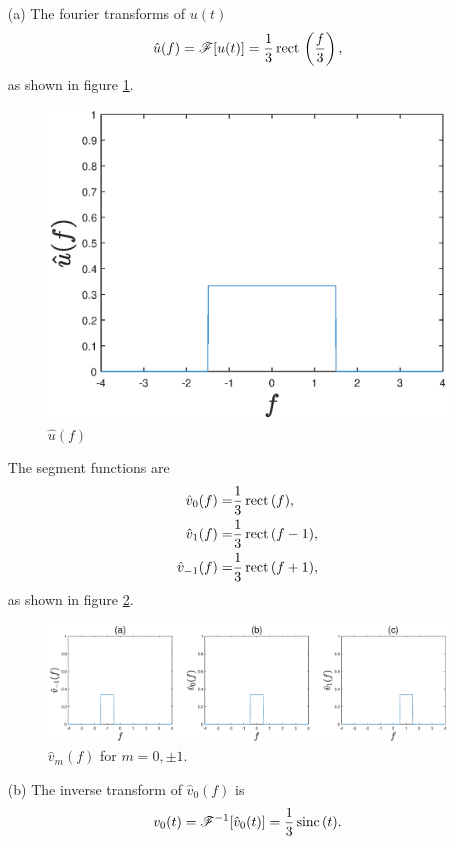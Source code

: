 \documentclass{assignment}
\begin{document}
\begin{sol}
    \begin{itemize}
        \item[(a)] The fourier transforms of $u(t)$
        \begin{align}
            \hat{u}(f)=\mathscr{F}[u(t)]=\frac{1}{3}\,\text{rect}\,\left(\frac{f}{3}\right),
        \end{align}
        as shown in figure \ref{A-8-P-6-u(f)}.
        \begin{figure}[H]
            \centering
            \includegraphics[width=.4\columnwidth]{A-8-P-6-u(f).eps}
            \caption{$\hat{u}(f)$}
            \label{A-8-P-6-u(f)}
        \end{figure}
        The segment functions are
        \begin{align}
            \hat{v}_0(f)=&\frac{1}{3}\,\text{rect}\,(f),\\
            \hat{v}_1(f)=&\frac{1}{3}\,\text{rect}\,(f-1),\\
            \hat{v}_{-1}(f)=&\frac{1}{3}\,\text{rect}\,(f+1),
        \end{align}
        as shown in figure \ref{A-8-P-6-vm(f)}.
        \begin{figure}[H]
            \centering
            \includegraphics[width=.99\columnwidth]{A-8-P-6-vm(f).eps}
            \caption{$\hat{v}_{m}(f)$ for $m=0,\pm 1$.}
            \label{A-8-P-6-vm(f)}
        \end{figure}
        \item[(b)] The inverse transform of $\hat{v}_0(f)$ is
        \begin{align}
            v_0(t)=\mathscr{F}^{-1}[\hat{v}_0(t)]=\frac{1}{3}\,\text{sinc}\,(t).
        \end{align}

\end{itemize}
\end{sol}
\end{document}
